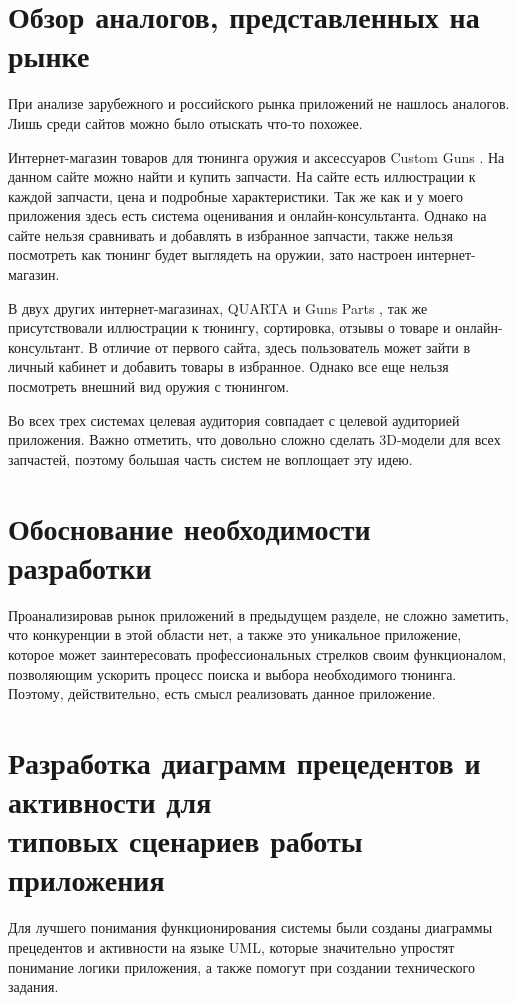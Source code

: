 \documentclass[14pt]{extreport}
\begin{document}
\newpage
\section{Обзор аналогов, представленных на рынке}

При анализе зарубежного и российского рынка приложений не нашлось аналогов. Лишь среди сайтов можно было отыскать что-то похожее.

Интернет-магазин товаров для тюнинга оружия и аксессуаров Custom Guns \cite{bib1}. На данном сайте можно найти и купить запчасти. На сайте есть иллюстрации к каждой запчасти, цена и подробные характеристики. Так же как и у моего приложения здесь есть система оценивания и онлайн-консультанта. Однако на сайте нельзя сравнивать и добавлять в избранное запчасти, также нельзя посмотреть как тюнинг будет выглядеть на оружии, зато настроен интернет-магазин.

В двух других интернет-магазинах, QUARTA \cite{bib2} и Guns Parts \cite{bib3}, так же присутствовали иллюстрации к тюнингу, сортировка, отзывы о товаре и онлайн-консультант. В отличие от первого сайта, здесь пользователь может зайти в личный кабинет и добавить товары в избранное. Однако все еще нельзя посмотреть внешний вид оружия с тюнингом. 

Во всех трех системах целевая аудитория совпадает с целевой аудиторией приложения. Важно отметить, что довольно сложно сделать 3D-модели для всех запчастей, поэтому большая часть систем не воплощает эту идею. 

\newpage
\section{Обоснование необходимости разработки}

Проанализировав рынок приложений в предыдущем разделе, не сложно заметить, что конкуренции в этой области нет, а также это уникальное приложение, которое может заинтересовать профессиональных стрелков своим функционалом, позволяющим ускорить процесс поиска и выбора необходимого тюнинга. Поэтому, действительно, есть смысл реализовать данное приложение.

\newpage
\section{Разработка диаграмм прецедентов и активности для \\ типовых сценариев работы приложения}

Для лучшего понимания функционирования системы были созданы диаграммы прецедентов и активности на языке UML, которые значительно упростят понимание логики приложения, а также помогут при создании технического задания.
\end{document}
